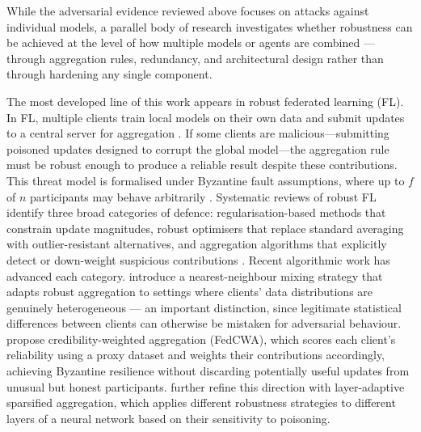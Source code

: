 While the adversarial evidence reviewed above focuses on attacks against individual models, a parallel body of research investigates whether robustness can be achieved at the level of how multiple models or agents are combined --- through aggregation rules, redundancy, and architectural design rather than through hardening any single component.

The most developed line of this work appears in robust federated learning (FL). In FL, multiple clients train local models on their own data and submit updates to a central server for aggregation \cite{pmlr-v54-mcmahan17a}. If some clients are malicious---submitting poisoned updates designed to corrupt the global model---the aggregation rule must be robust enough to produce a reliable result despite these contributions. This threat model is formalised under Byzantine fault assumptions, where up to 
$f$ of $n$ participants may behave arbitrarily \cite{lamport1982byzantine}. Systematic reviews of robust FL identify three broad categories of defence: regularisation-based methods that constrain update magnitudes, robust optimisers that replace standard averaging with outlier-resistant alternatives, and aggregation algorithms that explicitly detect or down-weight suspicious contributions \cite{uddin_systematic_2025, ahmad_enhancing_2025-1}. Recent algorithmic work has advanced each category. \cite{allouah_fixing_2023} introduce a nearest-neighbour mixing strategy that adapts robust aggregation to settings where clients' data distributions are genuinely heterogeneous --- an important distinction, since legitimate statistical differences between clients can otherwise be mistaken for adversarial behaviour. \cite{musa_fedcwa_nodate} propose credibility-weighted aggregation (FedCWA), which scores each client's reliability using a proxy dataset and weights their contributions accordingly, achieving Byzantine resilience without discarding potentially useful updates from unusual but honest participants. \cite{xu2025layer} further refine this direction with layer-adaptive sparsified aggregation, which applies different robustness strategies to different layers of a neural network based on their sensitivity to poisoning.

